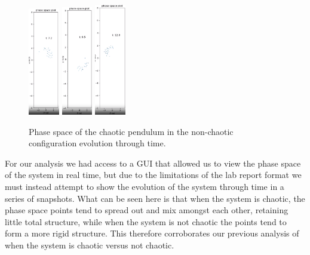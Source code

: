 \documentclass[11pt]{article} %
\begin{document}
\begin{figure}[H]
        \includegraphics[width=0.12\textwidth]{phase_3A.png}
        \includegraphics[width=0.12\textwidth]{phase_4A.png}
        \includegraphics[width=0.12\textwidth]{phase_5A.png}
        \caption{Phase space of the chaotic pendulum in the non-chaotic configuration evolution through time.}
    \end{figure}
    For our analysis we had access to a GUI that allowed us to view the phase space of the system in real time, but due to the limitations of the lab report
    format we must instead attempt to show the evolution of the system through time in a series of snapshots. What can be seen here is that when the system is
    chaotic, the phase space points tend to spread out and mix amongst each other, retaining little total structure, while when the system is not chaotic the
    points tend to form a more rigid structure. This therefore corroborates our previous analysis of when the system is chaotic versus not chaotic.
\end{document}
